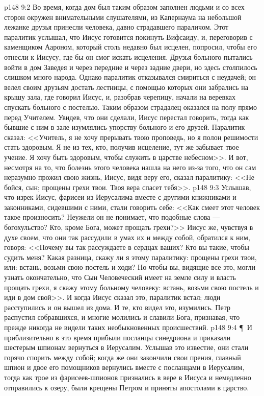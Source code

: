\vs p148 9:2 Во время, когда дом был таким образом заполнен людьми и со всех сторон окружен внимательными слушателями, из Капернаума на небольшой лежанке друзья принесли человека, давно страдавшего параличом. Этот паралитик услышал, что Иисус готовится покинуть Вифсаиду, и, переговорив с каменщиком Аароном, который столь недавно был исцелен, попросил, чтобы его отнесли к Иисусу, где бы он смог искать исцеления. Друзья больного пытались войти в дом Заведея и через передние и через задние двери, но здесь столпилось слишком много народа. Однако паралитик отказывался смириться с неудачей; он велел своим друзьям достать лестницы, с помощью которых они забрались на крышу зала, где говорил Иисус, и, разобрав черепицу, начали на веревках спускать больного с постелью. Таким образом страдалец оказался на полу прямо перед Учителем. Увидев, что они сделали, Иисус перестал говорить, тогда как бывшие с ним в зале изумлялись упорству больного и его друзей. Паралитик сказал: <<Учитель, я не хочу прерывать твою проповедь, но я полон решимости стать здоровым. Я не из тех, кто, получив исцеление, тут же забывает твое учение. Я хочу быть здоровым, чтобы служить в царстве небесном>>. И вот, несмотря на то, что болезнь этого человека нашла на него из\hyp{}за того, что он сам неразумно прожил свою жизнь, Иисус, видя веру его, сказал паралитику: <<Не бойся, сын; прощены грехи твои. Твоя вера спасет тебя>>.
\vs p148 9:3 Услышав, что изрек Иисус, фарисеи из Иерусалима вместе с другими книжниками и законниками, сидевшими с ними, стали говорить себе: <<Как смеет этот человек такое произносить? Неужели он не понимает, что подобные слова --- богохульство? Кто, кроме Бога, может прощать грехи?>> Иисус же, чувствуя в духе своем, что они так рассудили в умах их и между собой, обратился к ним, говоря: <<Почему вы так рассуждаете в сердцах ваших? Кто вы такие, чтобы судить меня? Какая разница, скажу ли я этому паралитику: прощены грехи твои, или: встань, возьми свою постель и ходи? Но чтобы вы, видящие все это, могли узнать окончательно, что Сын Человеческий имеет на земле силу и власть прощать грехи, я скажу этому больному человеку: встань, возьми свою постель и иди в дом свой>>. И когда Иисус сказал это, паралитик встал; люди расступились и он вышел из дома. И те, кто видел это, изумились. Петр распустил собравшихся, и многие молились и славили Бога, признавая, что прежде никогда не видели таких необыкновенных происшествий.
\vs p148 9:4 \P\ И приблизительно в это время прибыли посланцы синедриона и приказали шестерым шпионам вернуться в Иерусалим. Услышав это известие, они стали горячо спорить между собой; когда же они закончили свои прения, главный шпион и двое его помощников вернулись вместе с посланцами в Иерусалим, тогда как трое из фарисеев\hyp{}шпионов признались в вере в Иисуса и немедленно отправились к озеру, были крещены Петром и приняты апостолами в царство.

